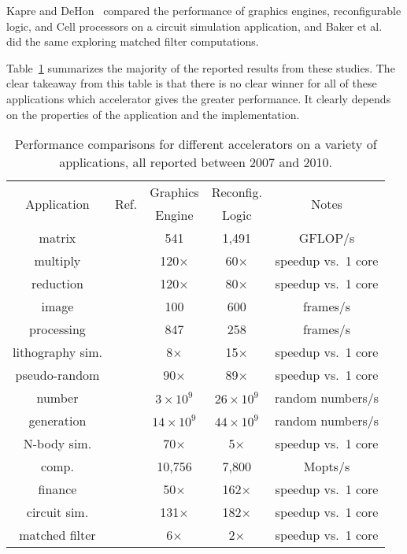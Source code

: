 Kapre and DeHon~\cite{kd09} compared the performance of graphics engines,
reconfigurable logic, and Cell processors on a circuit simulation application,
and Baker et al.~\cite{bgt07} did the same exploring matched filter
computations.

Table~\ref{tbl:compare} summarizes the majority of the
reported results from these studies.
The clear takeaway from this table is that there is no clear winner
for all of these applications which accelerator gives the greater performance.
It clearly depends on the properties of the application and the implementation.

\begin{table}[ht]
\centering
\caption{Performance comparisons for different accelerators on a variety of applications, all reported between 2007 and 2010.}
\label{tbl:compare}
\vspace{0.1in} 
\begin{tabular}{c | c | c | c | c }
\multirow{2}{*}{Application} & \multirow{2}{*}{Ref.} & Graphics & Reconfig. & \multirow{2}{*}{Notes} \\
  &   & Engine & Logic &  \\ \hline
matrix & \cite{cmhm10} & 541 & 1,491 & GFLOP/s\\
multiply  & \cite{jpbc10} & 120$\times$ & 60$\times$ & speedup vs.~1 core\\ \hline
reduction  & \cite{jpbc10} & 120$\times$ & 80$\times$ & speedup vs.~1 core\\ \hline
image & \cite{amy09} & 100 & 600 & frames/s \\
processing & \cite{bnw+10} & 847 & 258 & frames/s \\ \hline
lithography sim. & \cite{cz09} & 8$\times$ & 15$\times$ & speedup vs.~1 core\\ \hline
pseudo-random & \cite{jpbc10} & 90$\times$ & 89$\times$ & speedup vs.~1 core\\ 
number  & \cite{tb09} & $3\times10^9$ & $26\times10^9$ & random numbers/s\\
generation & \cite{thl09} & $14\times10^9$ & $44\times10^9$ & random numbers/s\\ \hline
N-body sim.  & \cite{jpbc10} & 70$\times$ & 5$\times$ & speedup vs.~1 core\\ \hline
comp.& \cite{cmhm10} & 10,756 & 7,800 & Mopts/s\\
finance  & \cite{tb10} & 50$\times$ & 162$\times$ & speedup vs.~1 core\\ \hline
circuit sim. & \cite{kd09} & 131$\times$ & 182$\times$ & speedup vs.~1 core\\ \hline
matched filter  & \cite{bgt07} & 6$\times$ & 2$\times$ & speedup vs.~1 core\\
\end{tabular}
\end{table}

